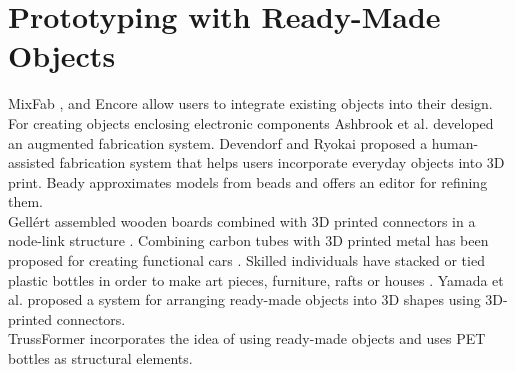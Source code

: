 \section{Prototyping with Ready-Made Objects}
MixFab \cite{weichel:2014}, and Encore \cite{chen:2015} allow users to integrate existing objects into their design. For creating objects enclosing electronic components Ashbrook et al. \cite{ashbrook:2016} developed an augmented fabrication system. Devendorf and Ryokai \cite{devendorf:2015} proposed a human-assisted fabrication system that helps users incorporate everyday objects into 3D print. Beady \cite{igarashi:2012} approximates models from beads and offers an editor for refining them.\\
Gellért assembled wooden boards combined with 3D printed connectors in a node-link structure \cite{gellert}. Combining carbon tubes with 3D printed metal has been proposed for creating functional cars \cite{divergent}.
Skilled individuals have stacked or tied plastic bottles in order to make art pieces, furniture, rafts or houses \cite{plasticbottles}. Yamada et al. \cite{yamada:2016} proposed a system for arranging ready-made objects into 3D shapes using 3D-printed connectors.\\
TrussFormer incorporates the idea of using ready-made objects and uses PET bottles as structural elements.

